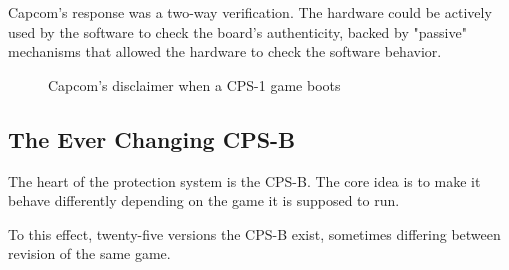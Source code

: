 Capcom's response was a two-way verification. The hardware could be actively used by the software to check the board's authenticity, backed by "passive" mechanisms that allowed the hardware to check the software behavior.

\begin{figure}[H]
\caption*{Capcom's disclaimer when a CPS-1 game boots}
\end{figure}

\subsection{The Ever Changing CPS-B}
The heart of the protection system is the CPS-B. The core idea is to make it behave differently depending on the game it is supposed to run.

To this effect, twenty-five versions the CPS-B exist\cite{mame_cps1_video}, sometimes differing between revision of the same game\cite{cpsBNumbers}.


